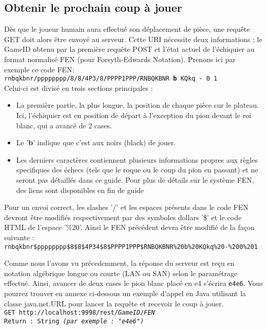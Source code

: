 \documentclass[a4paper,11pt]{article}
\begin{document}
\subsection{Obtenir le prochain coup à jouer}
        Dès que le joueur humain aura effectué son déplacement de pièce, une requête GET doit alors être envoyé au serveur. Cette URI nécessite deux informations : le GameID obtenu par la première requête POST et l'état actuel de l'échiquier au format normalisé FEN (pour Forsyth-Edwards Notation). Prenons ici par exemple ce code FEN: 
\\{\tt rnbqkbnr/pppppppp/8/8/4P3/8/PPPP1PPP/RNBQKBNR {\bf b} KQkq - 0 1}\\
Celui-ci est divisé en trois sections principales :
\begin{itemize}
   \item La première partie, la plus longue, la position de chaque pièce sur le plateau. Ici, l'échiquier est en position de départ à l'exception du pion devant le roi blanc, qui a avancé de 2 cases.
   \item Le '{\bf b}' indique que c'est aux noirs (black) de jouer.
   \item Les derniers caractères contiennent plusieurs informations propres aux règles specifiques des échecs (tels que le roque ou le coup du pion en passant) et ne seront pas détaillés dans ce guide. Pour plus de détails sur le système FEN, des liens sont disponibles en fin de guide 
\end{itemize}
        Pour un envoi correct, les slashes '/' et les espaces présents dans le code FEN devront être modifiés respectivement par des symboles dollars '\$' et le code HTML de l'espace '\%20'. Ainsi le FEN précédent devra être modifié de la façon suivante :
\\{\tt rnbqkbnr\$pppppppp\$8\$8\$4P34\$8\$PPPP1PPP\$RNBQKBNR\%20b\%20KQkq\%20-\%200\%201}
        
        Comme nous l’avons vu précedemment, la réponse du serveur est reçu en notation algébrique longue ou courte (LAN ou SAN) selon le paramétrage effectué. Ainsi, avancer de deux cases le pion blanc placé en e4 s'écrira {\tt e4e6}. Vous pourrez trouver en annexe ci-dessous un exemple d'appel en Java utilisant la classe java.net.URL pour lancer la requête et recevoir le coup à jouer.
\\{\tt GET http://localhost:9998/rest/{\em GameID}/{\em FEN}\\
Return : String {\em (par exemple : "e4e6")} }\\
        
\end{document}
